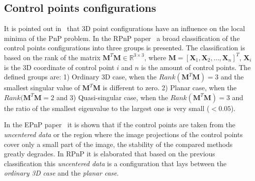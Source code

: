 \documentclass[letterpaper, 10 pt, conference]{ieeeconf}  %
\begin{document}
	
	
	
	
	\subsection{Control points configurations}
	
	
	It is pointed out in~\cite{Lepetit2008,Li2012} that 3D point configurations have an influence on the local minima of the PnP problem. In the RPnP paper~\cite{Li2012} a broad classification of the control points configurations into three groups is presented. The classification is based on the rank of the matrix $\mathbf{M}^T\mathbf{M} \in \mathbb{R}^{3\times 3}$, where $\mathbf{M} = [\mathbf{X}_1, \mathbf{X}_2,\dots,\mathbf{X}_n]^T$, $\mathbf{X}_i$ is the 3D coordinate of control point $i$ and $n$ is the amount of control points. The defined groups are: 1) Ordinary 3D case, when the $Rank(\mathbf{M}^T\mathbf{M}) = 3$  and the smallest singular value of $\mathbf{M}^T\mathbf{M}$ is different to zero. 2) Planar case, when the $Rank(\mathbf{M}^T\mathbf{M} = 2$ and 3) Quasi-singular case, when the $Rank(\mathbf{M}^T\mathbf{M}) = 3$ and the ratio of the smallest eigenvalue to the largest one is very small ($< 0.05$). 
	
	In the EPnP paper~\cite{Lepetit2008} it is shown that if the control points are taken from the \textit{uncentered data} or the region where the image projections of the control points cover only a small part of the image, the stability of the compared methods greatly degrades. In RPnP it is elaborated that based on the previous classification this \textit{uncentered data} is a configuration that lays between the \textit{ordinary 3D case} and the \textit{planar case}.
	
	
	
\end{document}
